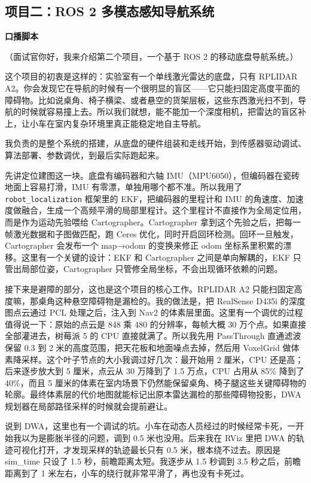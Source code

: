 \documentclass[11pt,a4paper]{article}
\begin{document}
\subsection*{项目二：ROS 2 多模态感知导航系统}

\textbf{口播脚本}

（面试官你好，我来介绍第二个项目，一个基于 ROS 2 的移动底盘导航系统。）

这个项目的初衷是这样的：实验室有一个单线激光雷达的底盘，只有 RPLIDAR A2。你会发现它在导航的时候有一个很明显的盲区——它只能扫固定高度平面的障碍物。比如说桌角、椅子横梁、或者悬空的货架层板，这些东西激光扫不到，导航的时候就容易撞上去。所以我们就想，能不能加一个深度相机，把雷达的盲区补上，让小车在室内复杂环境里真正能稳定地自主导航。

我负责的是整个系统的搭建，从底盘的硬件组装和走线开始，到传感器驱动调试、算法部署、参数调优，到最后实际跑起来。

先讲定位建图这一块。底盘有编码器和六轴 IMU（MPU6050），但编码器在瓷砖地面上容易打滑，IMU 有零漂，单独用哪个都不准。所以我用了 \texttt{robot\_localization} 框架里的 EKF，把编码器的里程计和 IMU 的角速度、加速度做融合，生成一个高频平滑的局部里程计。这个里程计不直接作为全局定位用，而是作为运动先验喂给 Cartographer。Cartographer 拿到这个先验之后，把每一帧激光数据和子图做匹配，跑 Ceres 优化，同时开启回环检测。回环一旦触发，Cartographer 会发布一个 map→odom 的变换来修正 odom 坐标系里积累的漂移。这里有一个关键的设计：EKF 和 Cartographer 之间是单向解耦的，EKF 只管出局部位姿，Cartographer 只管修全局坐标，不会出现循环依赖的问题。

接下来是避障的部分，这也是这个项目的核心工作。RPLIDAR A2 只能扫固定高度嘛，那桌角这种悬空障碍物是漏检的。我的做法是，把 RealSense D435i 的深度图点云通过 PCL 处理之后，注入到 Nav2 的体素层里面。这里有一个调优的过程值得说一下：原始的点云是 848 乘 480 的分辨率，每帧大概 30 万个点。如果直接全部灌进去，树莓派 5 的 CPU 直接就满了。所以我先用 PassThrough 直通滤波保留 0.3 到 2 米的高度范围，把天花板和地面噪点去掉，然后用 VoxelGrid 做体素降采样。这个叶子节点的大小我调过好几次：最开始用 2 厘米，CPU 还是高；后来逐步放大到 5 厘米，点云从 30 万降到了 1.5 万点，CPU 占用从 85\% 降到了 40\%，而且 5 厘米的体素在室内场景下仍然能保留桌角、椅子腿这些关键障碍物的轮廓。最终体素层的代价地图就能标记出原本雷达漏检的那些障碍物投影，DWA 规划器在局部路径采样的时候就会提前避让。

说到 DWA，这里也有一个调试的坑。小车在动态人员经过的时候经常卡死，一开始我以为是膨胀半径的问题，调到 0.5 米也没用。后来我在 RViz 里把 DWA 的轨迹可视化打开，才发现采样的轨迹最长只有 0.5 米，根本绕不过去。原因是 sim\_time 只设了 1.5 秒，前瞻距离太短。我逐步从 1.5 秒调到 3.5 秒之后，前瞻距离到了 1 米左右，小车的绕行就非常平滑了，再也没有卡死过。
\end{document}
